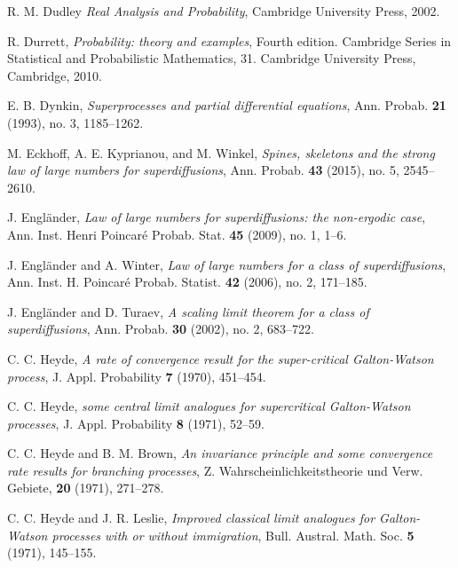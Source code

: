 \documentclass[12pt,a4paper]{amsart}
\theoremstyle{plain}
\theoremstyle{definition}
\numberwithin{equation}{section}
\begin{document}
\begin{thebibliography}{10}
  R. M. Dudley
\emph{Real Analysis and Probability},
  Cambridge University Press, 2002.

   R. Durrett,
   \emph{Probability: theory and examples},
   Fourth edition. Cambridge Series in Statistical and Probabilistic Mathematics, 31. Cambridge University Press, Cambridge, 2010.

  E. B. Dynkin,
  \emph{Superprocesses and partial differential equations},
  Ann. Probab. \textbf{21} (1993), no. 3, 1185--1262.

  M. Eckhoff, A. E. Kyprianou, and M. Winkel,
  \emph{Spines, skeletons and the strong law of large numbers for superdiffusions},
  Ann. Probab. \textbf{43} (2015), no. 5, 2545--2610.

  J. Engl\"{a}nder,
  \emph{Law of large numbers for superdiffusions: the non-ergodic case},
  Ann. Inst. Henri Poincar\'{e} Probab. Stat. \textbf{45} (2009), no. 1, 1--6.

  J. Engl\"{a}nder and A. Winter,
  \emph{Law of large numbers for a class of superdiffusions},
  Ann. Inst. H. Poincar\'{e} Probab. Statist. \textbf{42} (2006), no. 2, 171--185.

  J. Engl\"{a}nder and  D. Turaev,
  \emph{A scaling limit theorem for a class of superdiffusions},
  Ann. Probab. \textbf{30} (2002), no. 2, 683--722.

  C. C. Heyde,
  \emph{A rate of convergence result for the super-critical {G}alton-{W}atson process},
  J. Appl. Probability \textbf{7} (1970), 451--454.

  C. C. Heyde,
    \emph{some central limit analogues for supercritical {G}alton-{W}atson processes},
  J. Appl. Probability \textbf{8} (1971), 52--59.

  C. C. Heyde and B. M. Brown,
  \emph{An invariance principle and some convergence rate results for branching processes},
  Z. Wahrscheinlichkeitstheorie und Verw. Gebiete, \textbf{20} (1971), 271--278.

  C. C. Heyde and J. R. Leslie,
  \emph{Improved classical limit analogues for {G}alton-{W}atson processes with or without immigration},
  Bull. Austral. Math. Soc. \textbf{5} (1971), 145--155.


\end{thebibliography}
\end{document}

